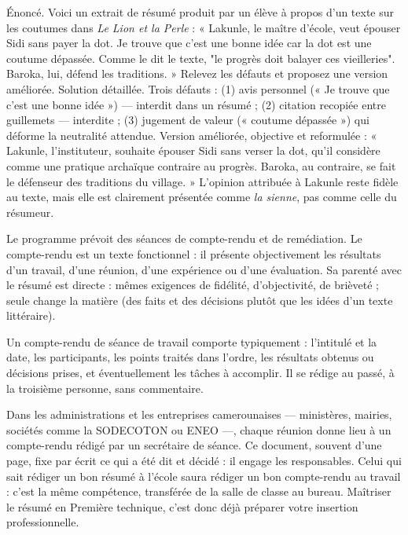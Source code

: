 \documentclass[11pt]{article}
\newcommand{\cle}[1]{{\popxbold\color{popdark}#1}}
\newcounter{popsec}
\newcounter{popsub}
\newcommand{\courssub}[1]{%
  \stepcounter{popsub}%
  \par\vspace{9pt}\noindent{\popxbold\fontsize{11.5}{13}\selectfont\color{popink}{\color{poporange}\thepopsec.\thepopsub}\hspace{6pt}#1}\par\nopagebreak\vspace{4pt}
}
\begin{document}
\begin{exoresolu}
Énoncé. Voici un extrait de résumé produit par un élève à propos d'un texte sur les coutumes dans \emph{Le Lion et la Perle} : « Lakunle, le maître d'école, veut épouser Sidi sans payer la dot. Je trouve que c'est une bonne idée car la dot est une coutume dépassée. Comme le dit le texte, "le progrès doit balayer ces vieilleries". Baroka, lui, défend les traditions. » Relevez les défauts et proposez une version améliorée.
\tcblower
Solution détaillée. Trois défauts : (1) avis personnel (« Je trouve que c'est une bonne idée ») — interdit dans un résumé ; (2) citation recopiée entre guillemets — interdite ; (3) jugement de valeur (« coutume dépassée ») qui déforme la neutralité attendue. Version améliorée, objective et reformulée : « Lakunle, l'instituteur, souhaite épouser Sidi sans verser la dot, qu'il considère comme une pratique archaïque contraire au progrès. Baroka, au contraire, se fait le défenseur des traditions du village. » L'opinion attribuée à Lakunle reste fidèle au texte, mais elle est clairement présentée comme \emph{la sienne}, pas comme celle du résumeur.
\end{exoresolu}

\courssub{Le compte-rendu : le cousin professionnel du résumé}

Le programme prévoit des séances de \cle{compte-rendu} et de remédiation. Le compte-rendu est un \cle{texte fonctionnel} : il présente objectivement les résultats d'un travail, d'une réunion, d'une expérience ou d'une évaluation. Sa parenté avec le résumé est directe : mêmes exigences de fidélité, d'objectivité, de brièveté ; seule change la matière (des faits et des décisions plutôt que les idées d'un texte littéraire).

Un compte-rendu de séance de travail comporte typiquement : l'intitulé et la date, les participants, les points traités dans l'ordre, les résultats obtenus ou décisions prises, et éventuellement les tâches à accomplir. Il se rédige au passé, à la troisième personne, sans commentaire.

\begin{savaistu}
Dans les administrations et les entreprises camerounaises — ministères, mairies, sociétés comme la SODECOTON ou ENEO —, chaque réunion donne lieu à un compte-rendu rédigé par un secrétaire de séance. Ce document, souvent d'une page, fixe par écrit ce qui a été dit et décidé : il engage les responsables. Celui qui sait rédiger un bon résumé à l'école saura rédiger un bon compte-rendu au travail : c'est la même compétence, transférée de la salle de classe au bureau. Maîtriser le résumé en Première technique, c'est donc déjà préparer votre insertion professionnelle.
\end{savaistu}
\end{document}
